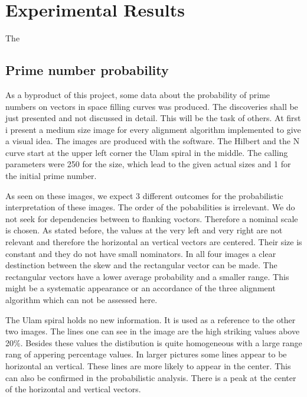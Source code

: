 \section{Experimental Results}
\label{sec:results}
The 
\subsection{Prime number probability}
\label{sec:resprob}
As a byproduct of this project, some data about the probability of prime numbers on vectors in space filling curves was produced. The discoveries shall be just presented and not discussed in detail. This will be the task of others. At first i present a medium size image for every alignment algorithm implemented to give a visual idea. The images are produced with the software. The Hilbert and the N curve start at the upper left corner the Ulam spiral in the middle. The calling parameters were 250 for the size, which lead to the given actual sizes and 1 for the initial prime number.

As seen on these images, we expect 3 different outcomes for the probabilistic interpretation of these images. The order of the pobabilities is irrelevant. We do not seek for dependencies between to flanking voctors. Therefore a nominal scale is chosen. As stated before, the values at the very left and very right are not relevant and therefore the horizontal an vertical vectors are centered. Their size is constant and they do not have small nominators.
In all four images a clear destinction between the skew and the rectangular vector can be made. The rectangular vectors have a lower average probability and a smaller range. This might be a systematic appearance or an accordance of the three alignment algorithm which can not be assessed here.

The Ulam spiral holds no new information. It is used as a reference to the other two images. The lines one can see in the image are the high striking values above 20\%. Besides these values the distibution is quite homogeneous with a large range rang of appering percentage values. In larger pictures some lines appear to be horizontal an vertical. These lines are more likely to appear in the center. This can also be confirmed in the probabilistic analysis. There is a peak at the center of the horizontal and vertical vectors.

